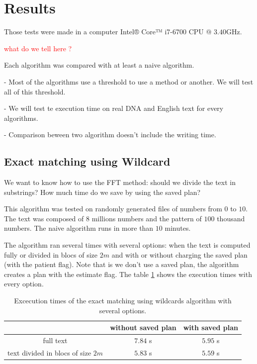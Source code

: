 \documentclass[preprint,12pt]{elsarticle}
\begin{document}




\section{Results}
\label{Res}

Those tests were made in a computer Intel® Core™ i7-6700 CPU @ $3.40$GHz.

\textcolor{red}{what do we tell here ?}

Each algorithm was compared with at least a naive algorithm.


- Most of the algorithms use a threshold to use a method or another. We will test all of this threshold.

- We will test te execution time on real DNA and English text for every algorithms.

- Comparison beween two algorithm doesn't include the writing time.



\subsection{Exact matching using Wildcard}
\label{WCTests}

We want to know how to use the FFT method:
should we divide the text in substrings?
How much time do we save by using the saved plan?

This algorithm was tested on randomly generated files of numbers from $0$ to $10$.
The text was composed of $8$ millions numbers and the pattern of $100$ thousand numbers.
The naive algorithm runs in more than $10$ minutes.

The algorithm ran several times with several options:
when the text is computed fully or divided in blocs of size $2m$
and with or without charging the saved plan (with the patient flag).
Note that is we don't use a saved plan, the algorithm creates a plan with the estimate flag.
The table \ref{TableWC} shows the execution times with every option.

\begin{table}[h]
\begin{tabular}{|c|c|c|}
\hline
			& without saved plan & with saved plan \\ \hline
full text	& $7.84$ s & $5.95$ s \\ \hline
text divided in blocs of size $2m$ &  $5.83$ s & $5.59$ s \\ \hline
\end{tabular}
\caption{Excecution times of the exact matching using wildcards algorithm with several options.}
\label{TableWC}
\end{table}
\end{document}
